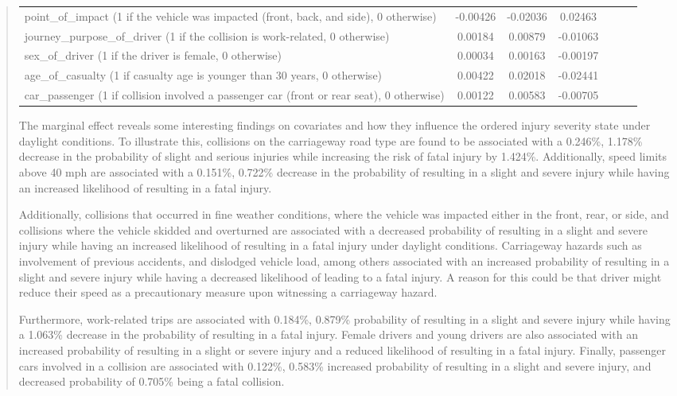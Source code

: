 \documentclass[12]{report}
\begin{document}
\begin{quote}
{\begin{table}[H]
\begin{tabular}{p{11cm} ccc ccc}
point\_of\_impact (1 if the vehicle was impacted (front, back, and side), 0 otherwise)  & -0.00426 & -0.02036 & 0.02463 \\

journey\_purpose\_of\_driver (1 if the collision is work-related, 0 otherwise)  & 0.00184 & 0.00879 & -0.01063 \\

sex\_of\_driver (1 if the driver is female, 0 otherwise) & 0.00034 & 0.00163 & -0.00197 \\

age\_of\_casualty (1 if casualty age is younger than 30 years, 0 otherwise) & 0.00422 & 0.02018 & -0.02441 \\

car\_passenger  (1 if collision involved a passenger car (front or rear seat), 0 otherwise)& 0.00122 & 0.00583 & -0.00705 \\

\bottomrule
\end{tabular}
\end{table}

The marginal effect reveals some interesting findings on covariates and how they influence the ordered injury severity state under daylight conditions. To illustrate this, collisions on the carriageway road type are found to be associated with a 
0.246\%,  1.178\%  decrease in the probability of slight and serious injuries while increasing the risk of fatal injury by 1.424\%. Additionally, speed limits above 40 mph are associated with a 0.151\%, 0.722\% decrease in the probability of resulting in a slight and severe injury while having an increased likelihood of resulting in a fatal injury.

Additionally, collisions that occurred in fine weather conditions, where the vehicle was impacted either in the front, rear, or side, and collisions where the vehicle skidded and overturned are associated with a decreased probability of resulting in a slight and severe injury while having an increased likelihood of resulting in a fatal injury under daylight conditions. Carriageway hazards such as involvement of previous accidents, and dislodged vehicle load, among others associated with an increased probability of resulting in a slight and severe injury while having a decreased likelihood of leading to a fatal injury.  A reason for this could be that driver might reduce their speed as a precautionary measure upon witnessing a carriageway hazard.

\clearpage
Furthermore, work-related trips are associated with  0.184\%, 0.879\% probability of resulting in a slight and severe injury while having a 1.063\% decrease in the probability of resulting in a fatal injury. Female drivers and young drivers are also associated with an increased probability of resulting in a slight or severe injury and  a reduced likelihood of resulting in a fatal injury. Finally, passenger cars involved in a collision are associated with 0.122\%, 0.583\% increased probability of resulting in a slight and severe injury, and decreased probability of  0.705\% being  a fatal collision.

}
\end{quote}
\end{document}
